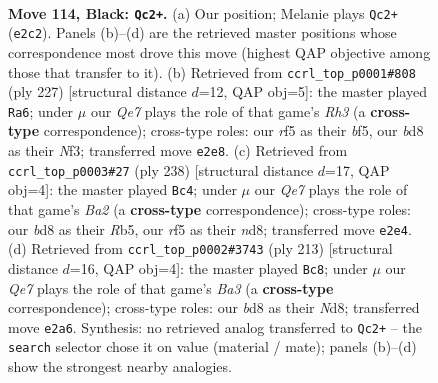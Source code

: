 \documentclass[11pt]{article}
\begin{document}
\clearpage

\begin{figure}[p]\centering
\begin{subfigure}{0.46\textwidth}\centering
\resizebox{\linewidth}{!}{%
\newchessgame
\chessboard[
  setfen={3B4/1k6/8/2KN1R2/8/8/4q3/8 b - - 5 114},
  showmover=false,
  pgfstyle=straightmove, color=movearrow, markmove={e2-c2}
]}
\caption{}
\end{subfigure}\hfill
\begin{subfigure}{0.46\textwidth}\centering
\resizebox{\linewidth}{!}{%
\newchessgame
\chessboard[
  setfen={8/8/7r/3K1B2/4N3/5n2/1k6/8 b - - 67 114},
  showmover=false,
  pgfstyle=straightmove, color=movearrow, markmove={h6-a6}
]}
\caption{}
\end{subfigure}
\\[4pt]
\begin{subfigure}{0.46\textwidth}\centering
\resizebox{\linewidth}{!}{%
\newchessgame
\chessboard[
  setfen={3n4/4n3/3k4/1R6/4K3/8/B7/8 w - - 61 120},
  showmover=false,
  pgfstyle=straightmove, color=movearrow, markmove={a2-c4}
]}
\caption{}
\end{subfigure}\hfill
\begin{subfigure}{0.46\textwidth}\centering
\resizebox{\linewidth}{!}{%
\newchessgame
\chessboard[
  setfen={3n4/3k4/b7/2K5/3N4/7R/8/8 b - - 76 107},
  showmover=false,
  pgfstyle=straightmove, color=movearrow, markmove={a6-c8}
]}
\caption{}
\end{subfigure}
\caption{\textbf{Move 114, Black: \texttt{Qc2+}.} (a) Our position; Melanie plays \texttt{Qc2+} (\texttt{e2c2}). Panels (b)--(d) are the retrieved master positions whose correspondence most drove this move (highest QAP objective among those that transfer to it). (b) Retrieved from \texttt{ccrl\_top\_p0001\#808} (ply 227) [structural distance $d$=12, QAP obj=5]: the master played \texttt{Ra6}; under $\mu$ our \emph{Qe7} plays the role of that game's \emph{Rh3} (a \textbf{cross-type} correspondence); cross-type roles: our \emph{r}f5 as their \emph{b}f5, our \emph{b}d8 as their \emph{N}f3; transferred move \texttt{e2e8}. (c) Retrieved from \texttt{ccrl\_top\_p0003\#27} (ply 238) [structural distance $d$=17, QAP obj=4]: the master played \texttt{Bc4}; under $\mu$ our \emph{Qe7} plays the role of that game's \emph{Ba2} (a \textbf{cross-type} correspondence); cross-type roles: our \emph{b}d8 as their \emph{R}b5, our \emph{r}f5 as their \emph{n}d8; transferred move \texttt{e2e4}. (d) Retrieved from \texttt{ccrl\_top\_p0002\#3743} (ply 213) [structural distance $d$=16, QAP obj=4]: the master played \texttt{Bc8}; under $\mu$ our \emph{Qe7} plays the role of that game's \emph{Ba3} (a \textbf{cross-type} correspondence); cross-type roles: our \emph{b}d8 as their \emph{N}d8; transferred move \texttt{e2a6}. Synthesis: no retrieved analog transferred to \texttt{Qc2+} -- the \texttt{search} selector chose it on value (material / mate); panels (b)--(d) show the strongest nearby analogies.}
\label{fig:thought-m227}
\end{figure}
\end{document}
